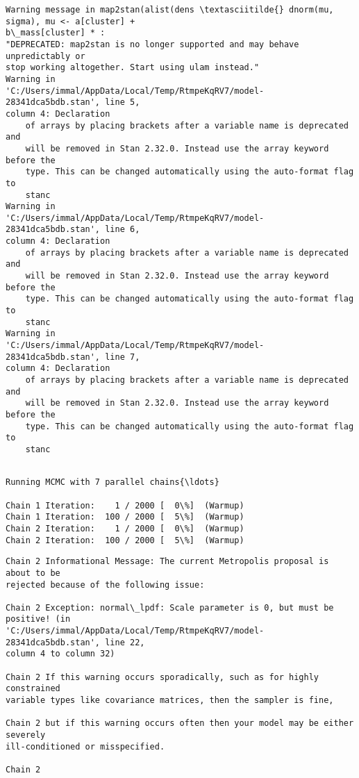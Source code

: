 \documentclass[11pt]{article}
\begin{document}
    \begin{Verbatim}[commandchars=\\\{\}]
Warning message in map2stan(alist(dens \textasciitilde{} dnorm(mu, sigma), mu <- a[cluster] +
b\_mass[cluster] * :
"DEPRECATED: map2stan is no longer supported and may behave unpredictably or
stop working altogether. Start using ulam instead."
Warning in
'C:/Users/immal/AppData/Local/Temp/RtmpeKqRV7/model-28341dca5bdb.stan', line 5,
column 4: Declaration
    of arrays by placing brackets after a variable name is deprecated and
    will be removed in Stan 2.32.0. Instead use the array keyword before the
    type. This can be changed automatically using the auto-format flag to
    stanc
Warning in
'C:/Users/immal/AppData/Local/Temp/RtmpeKqRV7/model-28341dca5bdb.stan', line 6,
column 4: Declaration
    of arrays by placing brackets after a variable name is deprecated and
    will be removed in Stan 2.32.0. Instead use the array keyword before the
    type. This can be changed automatically using the auto-format flag to
    stanc
Warning in
'C:/Users/immal/AppData/Local/Temp/RtmpeKqRV7/model-28341dca5bdb.stan', line 7,
column 4: Declaration
    of arrays by placing brackets after a variable name is deprecated and
    will be removed in Stan 2.32.0. Instead use the array keyword before the
    type. This can be changed automatically using the auto-format flag to
    stanc


    \end{Verbatim}

    \begin{Verbatim}[commandchars=\\\{\}]
Running MCMC with 7 parallel chains{\ldots}

Chain 1 Iteration:    1 / 2000 [  0\%]  (Warmup)
Chain 1 Iteration:  100 / 2000 [  5\%]  (Warmup)
Chain 2 Iteration:    1 / 2000 [  0\%]  (Warmup)
Chain 2 Iteration:  100 / 2000 [  5\%]  (Warmup)
    \end{Verbatim}

    \begin{Verbatim}[commandchars=\\\{\}]
Chain 2 Informational Message: The current Metropolis proposal is about to be
rejected because of the following issue:

Chain 2 Exception: normal\_lpdf: Scale parameter is 0, but must be positive! (in
'C:/Users/immal/AppData/Local/Temp/RtmpeKqRV7/model-28341dca5bdb.stan', line 22,
column 4 to column 32)

Chain 2 If this warning occurs sporadically, such as for highly constrained
variable types like covariance matrices, then the sampler is fine,

Chain 2 but if this warning occurs often then your model may be either severely
ill-conditioned or misspecified.

Chain 2

    \end{Verbatim}
\end{document}

